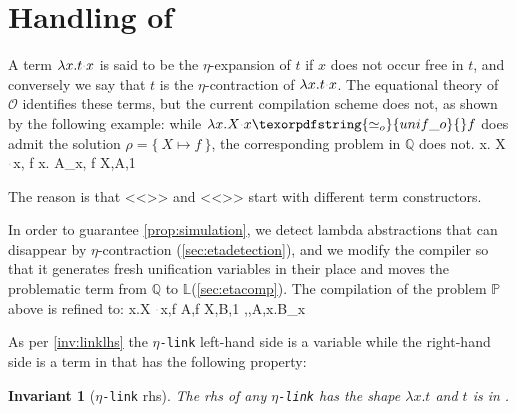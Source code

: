 \documentclass[sigconf,natbib=false,review]{acmart}
\newtheorem{invariant}{Invariant}
\newcommand{\appsep}{\ensuremath{\textcolor{lightgray}{\cdot}}}
\newcommand{\UnifRel}{\ensuremath{\simeq}}
\newcommand{\Uo}{\texorpdfstring{\ensuremath{\UnifRel_o}\xspace}{unif\_o}}
\newcommand{\linkMacro}[1]{\ensuremath{#1}\texttt{-link}\xspace}
\newcommand{\linketa} {\linkMacro{\eta}}
\newcommand{\Fo}{\texorpdfstring{\ensuremath{\mathcal{O}}\xspace}{O}}
\newcommand{\rhs}{rhs\xspace}
\newcommand{\linkStore}{\texorpdfstring{\ensuremath{\mathbb{L}}\xspace}{L}}
\newcommand{\foUnifPb}{\ensuremath{\mathbb{P}}\xspace}
\newcommand{\hoUnifPb}{\ensuremath{\mathbb{Q}}\xspace}
\begin{document}





\section{Handling of \maybeeta}\label{sec:eta}
A term 
$\lambda x. t \appsep x$ is said to be the $\eta$-expansion of $t$ if
$x$ does not occur free in $t$, and conversely we say that $t$ is the $\eta$-contraction of
$\lambda x. t \appsep x$. The equational theory of \Fo{} identifies these terms,
but the current compilation scheme does not,
as shown by the following example:
while $\lambda x.X \appsep x \Uo{} f$ does admit the solution
$\rho = \{~ X \mapsto f ~\}$, the corresponding problem in
\hoUnifPb does not.
%
\printAlll
  {{{\lambda x. X \appsep x, f}}}
  {{{\lambda x. A_x, f}}}
  {{{X,A,1}}}
  {{}}

\noindent
The reason is that <<>> and
<<>> start with different term constructors.

In order to guarantee \cref{prop:simulation}, we detect
lambda abstractions that can disappear by $\eta$-contraction
(\cref{sec:etadetection}), and we modify the compiler so that it
generates fresh unification variables
in their place and moves the problematic term 
from \hoUnifPb to \linkStore (\cref{sec:etacomp}). The compilation
of the problem \foUnifPb above is refined to: 
%
\printAlll
  {{{\lambda x.X \appsep x,f}}}
  {{{A,f}}}
  {{{X,B,1}}}
  {{{\eta,,A,\lambda x.B_x}}}

\noindent
As per \cref{inv:linklhs} the \linketa left-hand side is a variable
while the right-hand side is a term in \maybeeta that has the following property:

\begin{invariant}[\linketa \rhs]
  The \rhs of any \linketa %
  has the shape $\lambda x.t$
  and $t$ is in \wellb. 
  \label{inv:link-eta-right}
\end{invariant}
\end{document}
